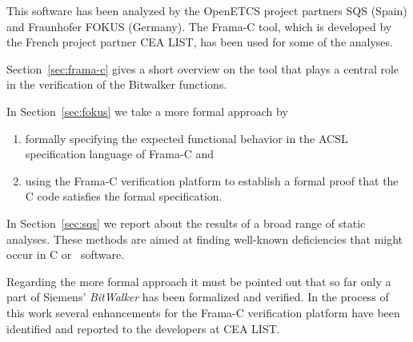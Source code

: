 This software has been analyzed by the OpenETCS project partners SQS (Spain)
and Fraunhofer FOKUS (Germany).
The Frama-C tool, which is developed by the French project partner {CEA LIST},
has been used for some of the analyses.

Section~\ref{sec:frama-c} gives a short overview on the \framacwp tool
that plays a central role in the verification of the Bitwalker functions.

In Section~\ref{sec:fokus} we take a more formal approach by 
\begin{enumerate}
\item formally specifying the expected functional behavior in the ACSL specification language of {Frama-C}
      and
\item using the {Frama-C} verification platform to establish a formal proof that the C code
      satisfies the formal specification.
\end{enumerate}

In Section~\ref{sec:sqs} we report about the results of a broad range
of static analyses. 
These methods are aimed at finding well-known deficiencies that might occur in C or \CC\ software.

Regarding the more formal approach it must be pointed out that so far only a 
part of Siemens' \emph{BitWalker} has been formalized and verified.
In the process of this work several enhancements for the Frama-C verification platform have 
been identified and reported to the developers at {CEA LIST}.




